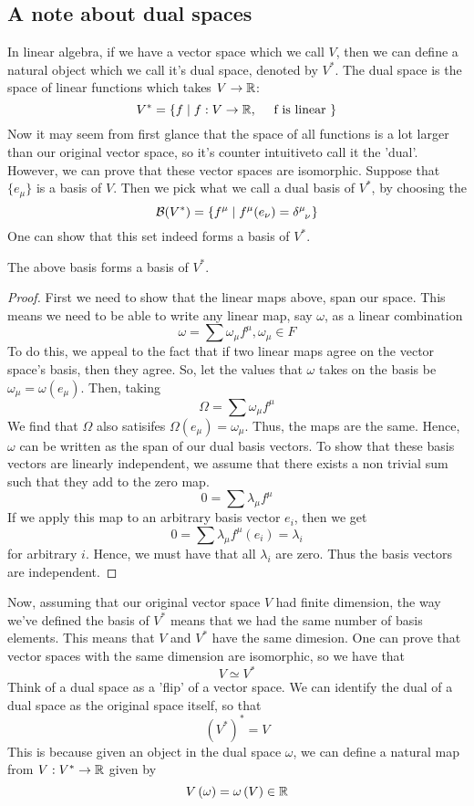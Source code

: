 \subsection{A note about dual spaces}
In linear algebra, if we have a vector space which we call $ V$, then we can define a natural object which we call it's dual space, denoted by $V^* $. The dual space is the space of linear functions which takes $V \to  \mathbb{R}$: 
\[
V^* = \{ f \mid f : V \to  \mathbb{R}, \quad \text{ f is linear } \} 
\] 
Now it may seem from first glance that the space of all functions is a lot larger than our original vector space, so it's counter intuitiveto call it the 'dual'. However, we can prove that these vector spaces are isomorphic. Suppose that $\{ e_\mu \} $ is a basis of $V$. Then we pick what we call a dual basis of $V^*$, by choosing the 
\[
\mathcal{B}( V ^* ) = \{ f^\mu \mid f^\mu ( e_\nu )  =\delta \indices{^\mu_\nu} \}  
\] 
One can show that this set indeed forms a basis of $V^* $.
\begin{thm}
The above basis forms a basis of $V^* $. 
 \begin{proof}
	First we need to show that the linear maps above, span our space. 
	This means we need to be able to write any linear map, say $ \omega $, as a linear combination 
	\[
		\omega = \sum \omega_\mu  f^\mu , \omega_\mu  \in F  
	\] 
	To do this, we appeal to the fact that if two linear maps agree on the vector space's basis, 
	then they agree. 
	So, let the values that $ \omega $ takes on the basis be $\omega_\mu  = \omega (e_\mu  ) $. Then, taking 
	\[
	 \Omega  = \sum \omega_\mu  f^\mu  
 \] We find that $ \Omega$ also satisifes $ \Omega( e_\mu  )  = \omega_\mu  $. 
 Thus, the maps are the same. 
 Hence, $\omega$ can be written as the span of our dual basis vectors. 
 To show that these basis vectors are linearly independent, 
 we assume that there exists a non trivial sum such that they add to the zero map.  
	\[
	 0  = \sum \lambda_\mu  f^\mu  
	\] If we apply this map to an arbitrary basis vector $ e_i$, then we get  \[
	0 = \sum \lambda_\mu  f^\mu  ( e_i ) = \lambda_i 				
	\] for arbitrary $i $. Hence, we must have that all $\lambda_i$ are zero. 
	Thus the basis vectors are independent. 
\end{proof}
\end{thm}
Now, assuming that our original vector space $ V$ had finite dimension, the way we've defined the basis of $V^* $
means that we had the same number of basis elements. 
This means that $V $ and $V^* $ have the same dimesion. 
One can prove that vector spaces with the same dimension are isomorphic, so we have that 
\[
V \simeq V^* 
\] Think of a dual space as a 'flip' of a vector space. 
We can identify the dual of a dual space as the original space itself, so that 
\[
\left( V^*  \right)^ * = V 
\] This is because given an object in the dual space $\omega$, we can define a natural map from 
$V: V^* \to  \mathbb{R} $ given by
\[
V \left( \omega  \right)  = \omega \left( V  \right) \in \mathbb{R}
\] 
